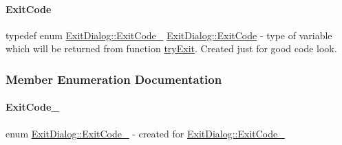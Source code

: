 \paragraph{\texorpdfstring{Exit\+Code}{ExitCode}}
{\footnotesize\ttfamily typedef enum \mbox{\hyperlink{classExitDialog_ad0d825dce42ecd6e8827f1b6f7167dcb}{Exit\+Dialog\+::\+Exit\+Code\+\_\+}} \mbox{\hyperlink{classExitDialog_a750dfbbef3dec32bec821122ee7b910c}{Exit\+Dialog\+::\+Exit\+Code}}} - type of variable which will be returned from function \mbox{\hyperlink{classExitDialog_a8c287b8910a1e54c9fed6dd172fbd134}{try\+Exit}}. Created just for good code look.

\subsubsection{Member Enumeration Documentation}
\mbox{\label{classExitDialog_ad0d825dce42ecd6e8827f1b6f7167dcb}} 
\paragraph{\texorpdfstring{Exit\+Code\+\_\+}{ExitCode\_}}
{\footnotesize\ttfamily enum \mbox{\hyperlink{classExitDialog_ad0d825dce42ecd6e8827f1b6f7167dcb}{Exit\+Dialog\+::\+Exit\+Code\+\_\+}}} - created for \mbox{\hyperlink{classExitDialog_ad0d825dce42ecd6e8827f1b6f7167dcb}{Exit\+Dialog\+::\+Exit\+Code\+\_\+}}


